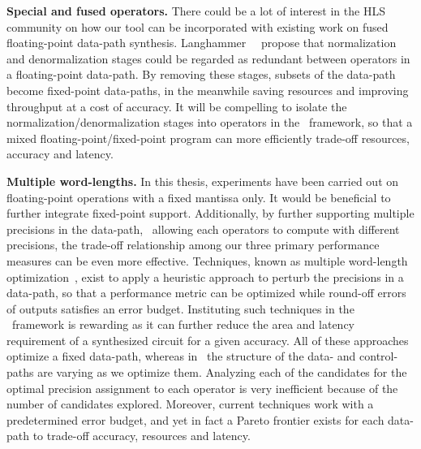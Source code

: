 \textbf{Special and fused operators.} There could be a lot of interest in the
HLS community on how our tool can be incorporated with existing work on fused
floating-point data-path synthesis.  Langhammer~\etal~\cite{langhammer} propose
that normalization and denormalization stages could be regarded as redundant
between operators in a floating-point data-path.  By removing these stages,
subsets of the data-path become fixed-point data-paths, in the meanwhile
saving resources and improving throughput at a cost of accuracy.  It will be
compelling to isolate the normalization/denormalization stages into operators
in the \soap~framework, so that a mixed floating-point/fixed-point program can
more efficiently trade-off resources, accuracy and latency.

\textbf{Multiple word-lengths.}  In this thesis, experiments have been carried
out on floating-point operations with a fixed mantissa only.  It would be
beneficial to further integrate fixed-point support.  Additionally, by further
supporting multiple precisions in the data-path, \ie~allowing each operators to
compute with different precisions, the trade-off relationship among our three
primary performance measures can be even more effective.  Techniques, known
as multiple word-length optimization~\cite{constantinides, lee06, cantin02},
exist to apply a heuristic approach to perturb the precisions in a data-path,
so that a performance metric can be optimized while round-off errors of outputs
satisfies an error budget.  Instituting such techniques in the \soap~framework
is rewarding as it can further reduce the area and latency requirement of a
synthesized circuit for a given accuracy.  All of these approaches optimize a
fixed data-path, whereas in \soap~the structure of the data- and control-paths
are varying as we optimize them.  Analyzing each of the candidates for the
optimal precision assignment to each operator is very inefficient because of
the number of candidates explored.  Moreover, current techniques work with a
predetermined error budget, and yet in fact a Pareto frontier exists for each
data-path to trade-off accuracy, resources and latency.

